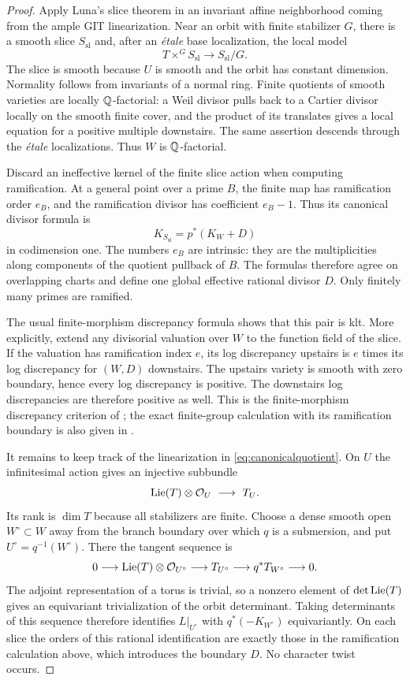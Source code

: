 \begin{proof}
Apply Luna's slice theorem \cite{Luna1973} in an invariant affine neighborhood coming from the ample GIT linearization. Near an orbit with finite stabilizer $G$, there is a smooth slice $S_{\mathrm{sl}}$ and, after an \emph{\'etale} base localization, the local model
\[
T\times^G S_{\mathrm{sl}}\longrightarrow S_{\mathrm{sl}}/G.
\]
The slice is smooth because $U$ is smooth and the orbit has constant dimension. Normality follows from invariants of a normal ring. Finite quotients of smooth varieties are locally $\mathbb Q$-factorial: a Weil divisor pulls back to a Cartier divisor locally on the smooth finite cover, and the product of its translates gives a local equation for a positive multiple downstairs. The same assertion descends through the \emph{\'etale} localizations. Thus $W$ is $\mathbb Q$-factorial.

Discard an ineffective kernel of the finite slice action when computing ramification. At a general point over a prime $B$, the finite map has ramification order $e_B$, and the ramification divisor has coefficient $e_B-1$. Thus its canonical divisor formula is
\[
K_{S_{\mathrm{sl}}}=p^*(K_W+D)
\]
in codimension one. The numbers $e_B$ are intrinsic: they are the multiplicities along components of the quotient pullback of $B$. The formulas therefore agree on overlapping charts and define one global effective rational divisor $D$. Only finitely many primes are ramified.

The usual finite-morphism discrepancy formula shows that this pair is klt. More explicitly, extend any divisorial valuation over $W$ to the function field of the slice. If the valuation has ramification index $e$, its log discrepancy upstairs is $e$ times its log discrepancy for $(W,D)$ downstairs. The upstairs variety is smooth with zero boundary, hence every log discrepancy is positive. The downstairs log discrepancies are therefore positive as well. This is the finite-morphism discrepancy criterion of \cite[Proposition~5.20]{KM1998}; the exact finite-group calculation with its ramification boundary is also given in \cite[Proposition~3.5 and equation~(3.4)]{BGLM2024}.

It remains to keep track of the linearization in \eqref{eq:canonicalquotient}. On $U$ the infinitesimal action gives an injective subbundle
\[
\Lie(T)\otimes\OO_U\ \longrightarrow\ T_U.
\]
Its rank is $\dim T$ because all stabilizers are finite. Choose a dense smooth open $W^\circ\subset W$ away from the branch boundary over which $q$ is a submersion, and put $U^\circ=q^{-1}(W^\circ)$. There the tangent sequence is
\[
0\longrightarrow\operatorname{Lie}(T)\otimes\mathcal O_{U^\circ}
\longrightarrow T_{U^\circ}
\longrightarrow q^*T_{W^\circ}\longrightarrow0.
\]
The adjoint representation of a torus is trivial, so a nonzero element of $\det\operatorname{Lie}(T)$ gives an equivariant trivialization of the orbit determinant. Taking determinants of this sequence therefore identifies $L|_{U^\circ}$ with $q^*(-K_{W^\circ})$ equivariantly. On each slice the orders of this rational identification are exactly those in the ramification calculation above, which introduces the boundary $D$. No character twist occurs.


\end{proof}
